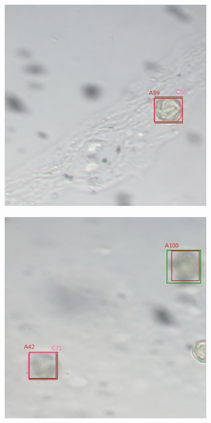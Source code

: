 \begin{figure}[htb]
  \centering
  \begin{subfigure}[t]{0.4\textwidth}
    \centering
    \includegraphics[width=\textwidth]{figs/method/baseline/Snap-408.pdf}
  \end{subfigure}%
  \hspace*{0.04\textwidth}
  \begin{subfigure}[t]{0.4\textwidth}
    \centering
    \includegraphics[width=\textwidth]{figs/method/baseline/Snap-028.pdf}

\end{subfigure}
\end{figure}
